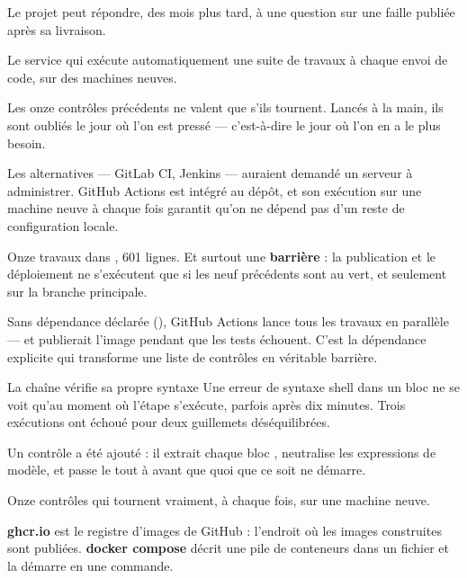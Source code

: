 \apport
Le projet peut répondre, des mois plus tard, à une question sur une faille
publiée après sa livraison.


\quoi
Le service qui exécute automatiquement une suite de travaux à chaque envoi de
code, sur des machines neuves.

\pourquoi
Les onze contrôles précédents ne valent que s'ils tournent. Lancés à la main,
ils sont oubliés le jour où l'on est pressé --- c'est-à-dire le jour où l'on en
a le plus besoin.

Les alternatives --- GitLab CI, Jenkins --- auraient demandé un serveur à
administrer. GitHub Actions est intégré au dépôt, et son exécution sur une
machine neuve à chaque fois garantit qu'on ne dépend pas d'un reste de
configuration locale.

\role
Onze travaux dans , 601 lignes. Et surtout une
\textbf{barrière} : la publication et le déploiement ne s'exécutent que si les
neuf précédents sont au vert, et seulement sur la branche principale.

\begin{retenir}
Sans dépendance déclarée (), GitHub Actions lance tous les travaux
en parallèle --- et publierait l'image pendant que les tests échouent. C'est la
dépendance explicite qui transforme une liste de contrôles en véritable
barrière.
\end{retenir}

\begin{piege}{La chaîne vérifie sa propre syntaxe}
Une erreur de syntaxe shell dans un bloc  ne se voit qu'au moment où
l'étape s'exécute, parfois après dix minutes. Trois exécutions ont échoué pour
deux guillemets déséquilibrées.

Un contrôle a été ajouté : il extrait chaque bloc , neutralise les
expressions de modèle, et passe le tout à  avant que quoi que ce
soit ne démarre.
\end{piege}

\apport
Onze contrôles qui tournent vraiment, à chaque fois, sur une machine neuve.


\quoi
\textbf{ghcr.io} est le registre d'images de GitHub : l'endroit où les images
construites sont publiées. \textbf{docker compose} décrit une pile de
conteneurs dans un fichier et la démarre en une commande.

